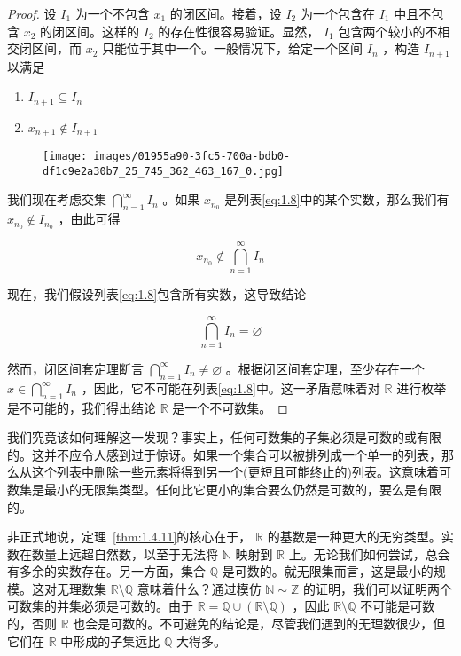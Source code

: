 \begin{proof}
设 \({I}_{1}\) 为一个不包含 \({x}_{1}\) 的闭区间。接着，设 \({I}_{2}\) 为一个包含在 \({I}_{1}\) 中且不包含 \({x}_{2}\) 的闭区间。这样的 \({I}_{2}\) 的存在性很容易验证。显然， \({I}_{1}\) 包含两个较小的不相交闭区间，而 \({x}_{2}\) 只能位于其中一个。一般情况下，给定一个区间 \({I}_{n}\) ，构造 \({I}_{n + 1}\) 以满足
\begin{enumerate}[label = (\roman*)]
\item  \({I}_{n + 1} \subseteq  {I}_{n}\)
\item \({x}_{n + 1} \notin  {I}_{n + 1}\) 
\end{enumerate}


\begin{figure}[h]
  \centering
  \texttt{[image: images/01955a90-3fc5-700a-bdb0-df1c9e2a30b7\_25\_745\_362\_463\_167\_0.jpg]}
\end{figure}


我们现在考虑交集 \(\mathop{\bigcap }\limits_{{n = 1}}^{\infty }{I}_{n}\) 。如果 \({x}_{{n}_{0}}\) 是列表\eqref{eq:1.8}中的某个实数，那么我们有 \({x}_{{n}_{0}} \notin  {I}_{{n}_{0}}\) ，由此可得

\[
{x}_{{n}_{0}} \notin  \mathop{\bigcap }\limits_{{n = 1}}^{\infty }{I}_{n}
\]

现在，我们假设列表\eqref{eq:1.8}包含所有实数，这导致结论

\[
\mathop{\bigcap }\limits_{{n = 1}}^{\infty }{I}_{n} = \varnothing
\]

然而，闭区间套定理断言 \(\mathop{\bigcap }\limits_{{n = 1}}^{\infty }{I}_{n} \neq  \varnothing\) 。根据闭区间套定理，至少存在一个 \(x \in  \mathop{\bigcap }\limits_{{n = 1}}^{\infty }{I}_{n}\) ，因此，它不可能在列表\eqref{eq:1.8}中。这一矛盾意味着对 \(\mathbb{R}\) 进行枚举是不可能的，我们得出结论 \(\mathbb{R}\) 是一个不可数集。  
\end{proof}

我们究竟该如何理解这一发现？事实上，任何可数集的子集必须是可数的或有限的。这并不应令人感到过于惊讶。如果一个集合可以被排列成一个单一的列表，那么从这个列表中删除一些元素将得到另一个(更短且可能终止的)列表。这意味着可数集是最小的无限集类型。任何比它更小的集合要么仍然是可数的，要么是有限的。

非正式地说，定理~\ref{thm:1.4.11}的核心在于， \(\mathbb{R}\) 的基数是一种更大的无穷类型。实数在数量上远超自然数，以至于无法将 \(\mathbb{N}\) 映射到 \(\mathbb{R}\) 上。无论我们如何尝试，总会有多余的实数存在。另一方面，集合 \(\mathbb{Q}\) 是可数的。就无限集而言，这是最小的规模。这对无理数集 \(\mathbb{R}\setminus\mathbb{Q}\) 意味着什么？通过模仿 \(\mathbb{N} \sim  \mathbb{Z}\) 的证明，我们可以证明两个可数集的并集必须是可数的。由于 \(\mathbb{R} = \mathbb{Q} \cup  (\mathbb{R}\setminus\mathbb{Q})\) ，因此 \(\mathbb{R}\setminus\mathbb{Q}\) 不可能是可数的，否则 \(\mathbb{R}\) 也会是可数的。不可避免的结论是，尽管我们遇到的无理数很少，但它们在 \(\mathbb{R}\) 中形成的子集远比 \(\mathbb{Q}\) 大得多。

